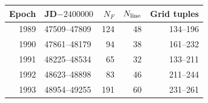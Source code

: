 \begin{tabular}{rlrrr}
\toprule
Epoch & JD$-2400000$ & $N_F$ & $N_{\rm line}$ & Grid tuples \\
\midrule
1989 & 47509--47809 & 124 & 48 & 134--196 \\
1990 & 47861--48179 & 94 & 38 & 161--232 \\
1991 & 48225--48534 & 65 & 32 & 133--211 \\
1992 & 48623--48898 & 83 & 46 & 211--244 \\
1993 & 48954--49255 & 191 & 60 & 231--261 \\
\bottomrule
\end{tabular}
